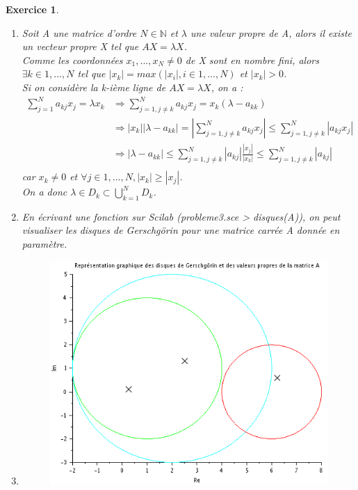 \documentclass[a4paper,11pt]{article}
\newtheorem{exo}{Exercice}
\newcommand{\abs}[1]{\left\lvert#1\right\rvert}
\begin{document}
\begin{exo} \ \\
\begin{enumerate}
\item
Soit A une matrice d'ordre $ N \in \mathbb{N} $ et $ \lambda $ une valeur propre de A, alors il existe un vecteur propre X tel que $ AX = \lambda X $. \ \\
Comme les coordonnées $ x_1,...,x_N \ne 0 $ de X sont en nombre fini, alors $ \exists k \in 1,...,N $ tel que $ \abs{x_k} = max(\abs{x_i}, i \in 1,...,N) $ et $ \abs{x_k} > 0 $. \ \\
Si on considère la k-ième ligne de $ AX = \lambda X $, on a : \ \\
\begin{equation}
\begin{aligned}
\sum_{j=1}^{N} a_{kj}x_j = \lambda x_k & \Rightarrow \sum_{j=1,j\ne k}^{N} a_{kj}x_j = x_k(\lambda - a_{kk}) \ \\
& \Rightarrow \abs{x_k}\abs{\lambda-a_{kk}} = \abs{\sum_{j=1,j\ne k}^{N} a_{kj}x_j} \le \sum_{j=1,j\ne k}^{N} \abs{a_{kj}x_j} \ \\
& \Rightarrow \abs{\lambda-a_{kk}} \le \sum_{j=1,j\ne k}^{N} \abs{a_{kj}}\frac{\abs{x_j}}{\abs{x_k}}
 \le \sum_{j=1,j\ne k}^{N} \abs{a_{kj}} \ \\
\end{aligned}
\end{equation}
car $ x_k \ne 0 $ et $ \forall j \in 1,...,N, \abs{x_k} \ge \abs{x_j} $. \ \\
On a donc $ \lambda \in D_k \subset \bigcup_{k=1}^ND_k $.
\item
En écrivant une fonction sur Scilab (probleme3.sce > disques(A)), on peut visualiser les disques de Gerschgörin pour une matrice carrée A donnée en paramètre.
\item
\begin{figure}[h] \centering
\includegraphics[scale=0.95]{../annexes/images/disques.PNG}

\end{figure}
\end{enumerate}
\end{exo}
\end{document}
